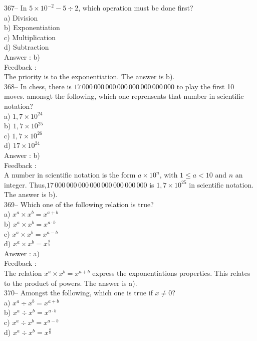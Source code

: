\documentclass[letterpaper, 12pt]{article}
\begin{document}
367-- In $5\times10^{-2}-5\div2$, which operation must be done first?\\
a) Division\\
b) Exponentiation\\
c) Multiplication\\
d) Subtraction\\

Answer : b)\\

Feedback : \\
The priority is to the exponentiation. The answer is b).\\

368-- In chess, there is $17\,000\,000\,000\,000\,000\,000\,000\,000$
to play the first 10 moves.  amonsgt the following, which one reprensents that number in scientific notation?\\
a) $1,7\times10^{24}$\\
b) $1,7\times10^{25}$\\
c) $1,7\times10^{26}$\\
d) $17\times10^{24}$\\

Answer : b)\\

Feedback : \\
A number in scientific notation is the form $a\times10^{n}$, with
$1\leq a<10$ and $n$ an integer.  
Thus,$17\,000\,000\,000\,000\,000\,000\,000\,000$ is $1,7\times10^{25}$ in scientific notation. The answer is b).\\

369--  Which one of the following relation is true?\\
a) $x^{a}\times x^{b}=x^{a+b}$\\
b) $x^{a}\times x^{b}=x^{a\cdot b}$\\
c) $x^{a}\times x^{b}=x^{a-b}$\\
d) $x^{a}\times x^{b}=x^{\frac{a}{b}}$\\

Answer : a)\\

Feedback : \\
The relation $x^{a}\times x^{b}=x^{a+b}$ express the exponentiations properties. 
This relates to the product of powers.  
The answer is a).\\

370--  Amongst the following, which one is true if $x \neq 0$?\\
a) $x^{a}\div x^{b}=x^{a+b}$\\
b) $x^{a}\div x^{b}=x^{a\cdot b}$\\
c) $x^{a}\div x^{b}=x^{a-b}$\\
d) $x^{a}\div x^{b}=x^{\frac{a}{b}}$\\
\end{document}

